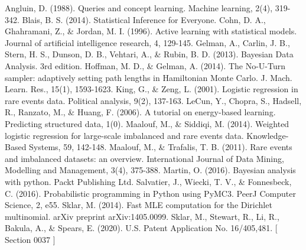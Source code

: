 \documentclass[twoside]{article}
\begin{document}
\begin{thebibliography}{20}

Angluin, D. (1988). Queries and concept learning. Machine learning, 2(4), 319-342.
Blais, B. S. (2014). Statistical Inference for Everyone.
Cohn, D. A., Ghahramani, Z., \& Jordan, M. I. (1996). Active learning with statistical models. Journal of artificial intelligence research, 4, 129-145.
Gelman, A., Carlin, J. B., Stern, H. S., Dunson, D. B., Vehtari, A., \& Rubin, B. D. (2013). Bayesian Data Analysis. 3rd edition.
Hoffman, M. D., \& Gelman, A. (2014). The No-U-Turn sampler: adaptively setting path lengths in Hamiltonian Monte Carlo. J. Mach. Learn. Res., 15(1), 1593-1623.
King, G., \& Zeng, L. (2001). Logistic regression in rare events data. Political analysis, 9(2), 137-163.
LeCun, Y., Chopra, S., Hadsell, R., Ranzato, M., \& Huang, F. (2006). A tutorial on energy-based learning. Predicting structured data, 1(0).
Maalouf, M., \& Siddiqi, M. (2014). Weighted logistic regression for large-scale imbalanced and rare events data. Knowledge-Based Systems, 59, 142-148.
Maalouf, M., \& Trafalis, T. B. (2011). Rare events and imbalanced datasets: an overview. International Journal of Data Mining, Modelling and Management, 3(4), 375-388.
Martin, O. (2016). Bayesian analysis with python. Packt Publishing Ltd.
Salvatier, J., Wiecki, T. V., \& Fonnesbeck, C. (2016). Probabilistic programming in Python using PyMC3. PeerJ Computer Science, 2, e55.
Sklar, M. (2014). Fast MLE computation for the Dirichlet multinomial. arXiv preprint arXiv:1405.0099.
Sklar, M., Stewart, R., Li, R., Bakula, A., \& Spears, E. (2020). U.S. Patent Application No. 16/405,481. [ Section 0037 ]

\end{thebibliography}
\end{document}
